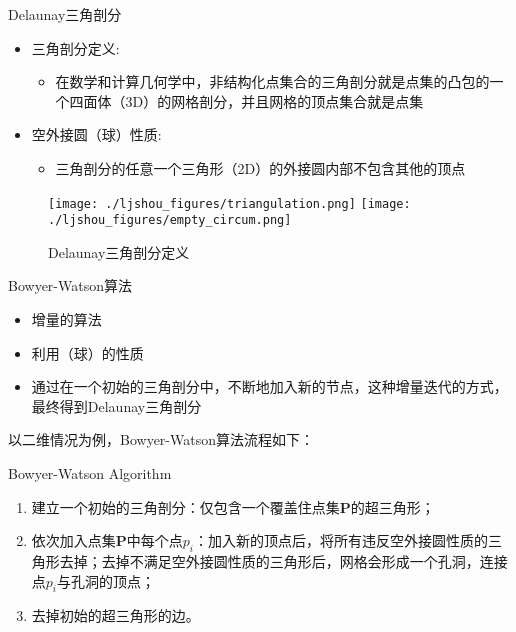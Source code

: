 \documentclass[mathserif]{beamer}
\begin{document}
\begin{CJK}{UTF8}{gkai}
		\begin{frame}{Delaunay三角剖分}
		    \begin{itemize}
		    \item 三角剖分定义:
		        \begin{itemize}
		        \item 在数学和计算几何学中，非结构化点集合{\bfP}的三角剖分就是点集的凸包的一个四面体（3D）的网格剖分，并且网格的顶点集合就是点集{\bfP}
		        \end{itemize}
		    \item 空外接圆（球）性质:
		        \begin{itemize}
		        \item 三角剖分的任意一个三角形（2D）的外接圆内部不包含其他的顶点
		        \end{itemize}
		    \end{itemize}
		    
		    \begin{figure}
		    \centering
		    \texttt{[image: ./ljshou\_figures/triangulation.png]}
		    \texttt{[image: ./ljshou\_figures/empty\_circum.png]}
		    \caption{Delaunay三角剖分定义}
		    \end{figure}
	\end{frame}
		
		\begin{frame}{Bowyer-Watson算法}
		    \begin{itemize}
    		    \item 增量的算法
    		    \item 利用{（球）}的性质
    		    \item 通过在一个初始的三角剖分中，不断地加入新的节点，这种增量迭代的方式，最终得到Delaunay三角剖分
		    \end{itemize}
            以二维情况为例，Bowyer-Watson算法流程如下：
            \begin{block}{Bowyer-Watson Algorithm}
                \begin{enumerate}
                    \item 建立一个初始的三角剖分：仅包含一个覆盖住点集{\bf P}的超三角形；
                    \item 依次加入点集{\bf P}中每个点$p_i$：加入新的顶点后，将所有违反空外接圆性质的三角形去掉；去掉不满足空外接圆性质的三角形后，网格会形成一个孔洞，连接点$p_i$与孔洞的顶点；
                    \item 去掉初始的超三角形的边。
                \end{enumerate}
            \end{block}
		\end{frame}
		

\end{CJK}
\end{document}
